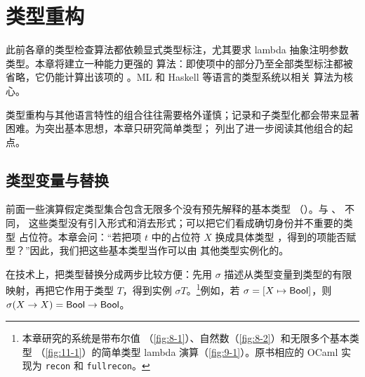 
\chapter{类型重构}
\label{chap:22}

此前各章的类型检查算法都依赖显式类型标注，尤其要求 lambda 抽象注明参数
类型。本章将建立一种能力更强的
算法：即使项中的部分乃至全部类型标注都被省略，它仍能计算出该项的
。ML 和 Haskell 等语言的类型系统以相关
算法为核心。

类型重构与其他语言特性的组合往往需要格外谨慎；记录和子类型化都会带来显著
困难。为突出基本思想，本章只研究简单类型；
列出了进一步阅读其他组合的起点。

\section{类型变量与替换}
\label{sec:22.1}

前面一些演算假定类型集合包含无限多个没有预先解释的基本类型
（）。与 、 不同，
这些类型没有引入形式和消去形式；可以把它们看成确切身份并不重要的类型
占位符。本章会问：“若把项 \(t\) 中的占位符 \(X\) 换成具体类型
，得到的项能否赋型？”因此，我们把这些基本类型当作可以由
其他类型实例化的。

在技术上，把类型替换分成两步比较方便：先用 \(\sigma\) 描述从类型变量到类型的有限映射，再把它作用于类型
\(T\)，得到实例 \(\sigma T\)。\footnote{本章研究的系统是带布尔值
（\cref{fig:8-1}）、自然数（\cref{fig:8-2}）和无限多个基本类型
（\cref{fig:11-1}）的简单类型 lambda 演算（\cref{fig:9-1}）。原书相应的
OCaml 实现为 \texttt{recon} 和 \texttt{fullrecon}。}例如，若
\(\sigma=[X\mapsto\mathsf{Bool}]\)，则
\(\sigma(X\to X)=\mathsf{Bool}\to\mathsf{Bool}\)。

